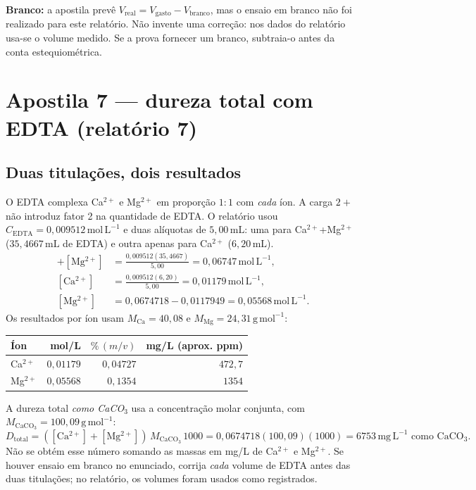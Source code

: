 \documentclass[11pt,a4paper]{article}
\newcommand{\molL}{\mathrm{mol\,L^{-1}}}
\newcommand{\mgL}{\mathrm{mg\,L^{-1}}}
\newcommand{\mL}{\mathrm{mL}}
\newcommand{\destaque}[1]{\par\medskip\noindent\colorbox{cinza}{\parbox{\dimexpr\linewidth-2\fboxsep\relax}{\strut #1\strut}}\par\medskip}
\begin{document}
\destaque{\textbf{Branco:} a apostila prevê $V_{\mathrm{real}}=V_{\mathrm{gasto}}-V_{\mathrm{branco}}$, mas o ensaio em branco não foi realizado para este relatório. Não invente uma correção: nos dados do relatório usa-se o volume medido. Se a prova fornecer um branco, subtraia-o antes da conta estequiométrica.}

\section{Apostila 7 --- dureza total com EDTA (relatório 7)}
\subsection*{Duas titulações, dois resultados}
O EDTA complexa Ca$^{2+}$ e Mg$^{2+}$ em proporção $1{:}1$ com \emph{cada} íon. A carga $2+$ não introduz fator 2 na quantidade de EDTA. O relatório usou $C_{\mathrm{EDTA}}=0{,}009512\,\molL$ e duas alíquotas de $5{,}00\,\mL$: uma para Ca$^{2+}$+Mg$^{2+}$ ($35{,}4667\,\mL$ de EDTA) e outra apenas para Ca$^{2+}$ ($6{,}20\,\mL$).
\begin{align}
[\mathrm{Ca^{2+}}]+[\mathrm{Mg^{2+}}]
&=\frac{0{,}009512(35{,}4667)}{5{,}00}=0{,}06747\,\molL,\\
[\mathrm{Ca^{2+}}]
&=\frac{0{,}009512(6{,}20)}{5{,}00}=0{,}01179\,\molL,\\
[\mathrm{Mg^{2+}}]
&=0{,}0674718-0{,}0117949=0{,}05568\,\molL.
\end{align}
Os resultados por íon usam $M_{\mathrm{Ca}}=40{,}08$ e $M_{\mathrm{Mg}}=24{,}31\,\mathrm{g\,mol^{-1}}$:
\begin{center}
\begin{tabular}{@{}lrrr@{}}\toprule
Íon & mol/L & $\%\,(m/v)$ & mg/L (aprox. ppm)\\\midrule
Ca$^{2+}$ & $0{,}01179$ & $0{,}04727$ & $472{,}7$\\
Mg$^{2+}$ & $0{,}05568$ & $0{,}1354$ & $1354$\\\bottomrule
\end{tabular}
\end{center}
A dureza total \emph{como CaCO$_3$} usa a concentração molar conjunta, com $M_{\mathrm{CaCO_3}}=100{,}09\,\mathrm{g\,mol^{-1}}$:
\begin{equation}
D_{\mathrm{total}}=([\mathrm{Ca^{2+}}]+[\mathrm{Mg^{2+}}])\,M_{\mathrm{CaCO_3}}\,1000
=0{,}0674718(100{,}09)(1000)=6753\,\mgL\text{ como CaCO}_3.
\end{equation}
Não se obtém esse número somando as massas em mg/L de Ca$^{2+}$ e Mg$^{2+}$. Se houver ensaio em branco no enunciado, corrija \emph{cada} volume de EDTA antes das duas titulações; no relatório, os volumes foram usados como registrados.
\end{document}
